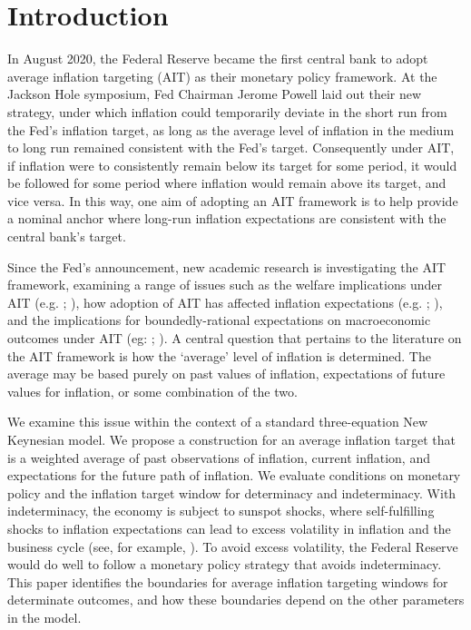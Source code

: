 \documentclass[english,authoryear,12pt]{elsarticle}
\begin{document}
\section{\label{Intro}Introduction}
In August 2020, the Federal Reserve became the first central bank to adopt average inflation targeting (AIT) as their monetary policy framework. At the Jackson Hole symposium, Fed Chairman Jerome Powell laid out their new strategy, under which inflation could temporarily deviate in the short run from the Fed's inflation target, as long as the average level of inflation in the medium to long run remained consistent with the Fed's target. Consequently under AIT, if inflation were to consistently remain below its target for some period, it would be followed for some period where inflation would remain above its target, and vice versa. In this way, one aim of adopting an AIT framework is to help provide a nominal anchor where long-run inflation expectations are consistent with the central bank's target.

Since the Fed's announcement, new academic research is investigating the AIT framework, examining a range of issues such as the welfare implications under AIT (e.g. \citealp{budianto2020}; \citealp{eo2020}), how adoption of AIT has affected inflation expectations (e.g. \citealp{coibion2020}; \citealp{hoffmann2022}), and the implications for boundedly-rational expectations on macroeconomic outcomes under AIT (eg: \citealp{honka2021}; \citealp{budianto2020}). A central question that pertains to the literature on the AIT framework is how the `average' level of inflation is determined. The average may be based purely on past values of inflation, expectations of future values for inflation, or some combination of the two.

We examine this issue within the context of a standard three-equation New Keynesian model. We propose a construction for an average inflation target that is a weighted average of past observations of inflation, current inflation, and expectations for the future path of inflation. We evaluate conditions on monetary policy and the inflation target window for determinacy and indeterminacy. With indeterminacy, the economy is subject to sunspot shocks, where self-fulfilling shocks to inflation expectations can lead to excess volatility in inflation and the business cycle (see, for example, \citealp{lubik2004}). To avoid excess volatility, the Federal Reserve would do well to follow a monetary policy strategy that avoids indeterminacy. This paper identifies the boundaries for average inflation targeting windows for determinate outcomes, and how these boundaries depend on the other parameters in the model.
\end{document}
